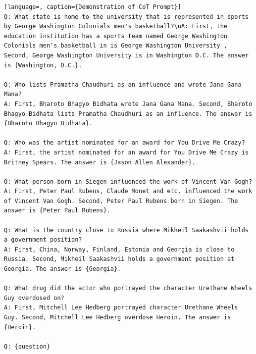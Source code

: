 \documentclass[11pt]{article}
\begin{document}
\begin{lstlisting}[language=, caption={Demonstration of CoT Prompt}]
Q: What state is home to the university that is represented in sports by George Washington Colonials men's basketball?\nA: First, the education institution has a sports team named George Washington Colonials men's basketball in is George Washington University , Second, George Washington University is in Washington D.C. The answer is {Washington, D.C.}.

Q: Who lists Pramatha Chaudhuri as an influence and wrote Jana Gana Mana?
A: First, Bharoto Bhagyo Bidhata wrote Jana Gana Mana. Second, Bharoto Bhagyo Bidhata lists Pramatha Chaudhuri as an influence. The answer is {Bharoto Bhagyo Bidhata}.

Q: Who was the artist nominated for an award for You Drive Me Crazy?
A: First, the artist nominated for an award for You Drive Me Crazy is Britney Spears. The answer is {Jason Allen Alexander}.

Q: What person born in Siegen influenced the work of Vincent Van Gogh?
A: First, Peter Paul Rubens, Claude Monet and etc. influenced the work of Vincent Van Gogh. Second, Peter Paul Rubens born in Siegen. The answer is {Peter Paul Rubens}.

Q: What is the country close to Russia where Mikheil Saakashvii holds a government position?
A: First, China, Norway, Finland, Estonia and Georgia is close to Russia. Second, Mikheil Saakashvii holds a government position at Georgia. The answer is {Georgia}.

Q: What drug did the actor who portrayed the character Urethane Wheels Guy overdosed on?
A: First, Mitchell Lee Hedberg portrayed character Urethane Wheels Guy. Second, Mitchell Lee Hedberg overdose Heroin. The answer is {Heroin}.

Q: {question}
\end{lstlisting}
\label{CoT Prompt}


\end{document}
